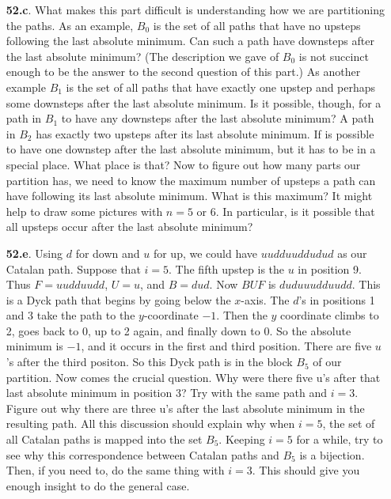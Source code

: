 \documentclass[10pt,]{book}
\theoremstyle{plain}
\theoremstyle{definition}
\theoremstyle{definition}
\numberwithin{equation}{chapter}
\begin{document}
\begin{itemize}[itemsep=1em]
\item[\textbf{52.c}.]\hypertarget{p-314}{}%
What makes this part difficult is understanding how we are partitioning the paths. As an example, \(B_0\) is the set of all paths that have no upsteps following the last absolute minimum. Can such a path have downsteps after the last absolute minimum? (The description we gave of \(B_0\) is not succinct enough to be the answer to the second question of this part.) As another example \(B_1\) is the set of all paths that have exactly one upstep and perhaps some downsteps after the last absolute minimum. Is it possible, though, for a path in \(B_1\) to have any downsteps after the last absolute minimum? A path in \(B_2\) has exactly two upsteps after its last absolute minimum. If is possible to have one downstep after the last absolute minimum, but it has to be in a special place. What place is that? Now to figure out how many parts our partition has, we need to know the maximum number of upsteps a path can have following its last absolute minimum. What is this maximum? It might help to draw some pictures with \(n = 5\) or \(6\). In particular, is it possible that all upsteps occur after the last absolute minimum?%

\item[\textbf{52.e}.]\hypertarget{p-319}{}%
Using \(d\) for down and \(u\) for up, we could have \(uudduuddudud\) as our Catalan path. Suppose that \(i = 5\). The fifth upstep is the \(u\) in position 9. Thus \(F = uudduudd\), \(U = u\), and \(B = dud\). Now \(BU F\) is \(duduuudduudd\). This is a Dyck path that begins by going below the \(x\)-axis. The \(d\)'s in positions 1 and 3 take the path to the \(y\)-coordinate \(-1\). Then the \(y\) coordinate climbs to 2, goes back to 0, up to 2 again, and finally down to 0. So the absolute minimum is \(-1\), and it occurs in the first and third position. There are five \(u\)'s after the third positon. So this Dyck path is in the block \(B_5\) of our partition. Now comes the crucial question. Why were there five u's after that last absolute minimum in position 3? Try with the same path and \(i = 3\). Figure out why there are three u's after the last absolute minimum in the resulting path. All this discussion should explain why when \(i = 5\), the set of all Catalan paths is mapped into the set \(B_5\). Keeping \(i = 5\) for a while, try to see why this correspondence between Catalan paths and \(B_5\) is a bijection. Then, if you need to, do the same thing with \(i = 3\). This should give you enough insight to do the general case.%


\end{itemize}
\end{document}
